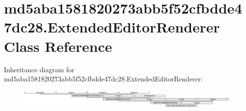 \hypertarget{classmd5aba1581820273abb5f52cfbdde47dc28_1_1ExtendedEditorRenderer}{}\section{md5aba1581820273abb5f52cfbdde47dc28.\+Extended\+Editor\+Renderer Class Reference}
\label{classmd5aba1581820273abb5f52cfbdde47dc28_1_1ExtendedEditorRenderer}
Inheritance diagram for md5aba1581820273abb5f52cfbdde47dc28.\+Extended\+Editor\+Renderer\+:\begin{figure}[H]
\begin{center}
\leavevmode
\includegraphics[height=0.980392cm]{classmd5aba1581820273abb5f52cfbdde47dc28_1_1ExtendedEditorRenderer}
\end{center}
\end{figure}
